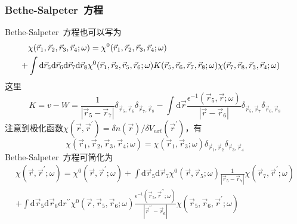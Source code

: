 \documentclass[cjk,slidestop,compress,mathserif,blue]{beamer}
\begin{document}
\frame
{
	\frametitle{\textrm{Bethe-Salpeter~}方程}
\textrm{Bethe-Salpeter~}方程也可以写为
\begin{displaymath}
	\hspace*{-10pt}
	\begin{aligned}
		&\chi(\vec r_1,\vec r_2,\vec r_3,\vec r_4;\omega)=\chi^0(\vec r_1,\vec r_2,\vec r_3,\vec r_4;\omega)\\
		+&\int\mathrm{d}\vec r_5\mathrm{d}\vec r_6\mathrm{d}\vec r_7\mathrm{d}\vec r_8\chi^0(\vec r_1,\vec r_2,\vec r_5,\vec r_6;\omega)K(\vec r_5,\vec r_6,\vec r_7,\vec r_8;\omega)\chi(\vec r_7,\vec r_8,\vec r_3,\vec r_4;\omega)
	\end{aligned}
\end{displaymath}
这里
\begin{displaymath}
	K=v-W=\frac1{|\vec r_5-\vec r_7|}\delta_{\vec r_5,\vec r_6}\delta_{\vec r_7,\vec r_8}-\int\mathrm{d}\vec r\frac{\epsilon^{-1}(\vec r_5,\vec r;\omega)}{|\vec r-\vec r_6|}\delta_{\vec r_5,\vec r_7}\delta_{\vec r_6,\vec r_8}
\end{displaymath}
注意到极化函数$\chi(\vec r,\vec r^{\prime})=\delta n(\vec r)/\delta V_{ext}(\vec r^{\prime})$，有
\begin{displaymath}
	\chi(\vec r_1,\vec r_2,\vec r_3,\vec r_4;\omega)=\chi(\vec r_1,\vec r_3;\omega)\delta_{\vec r_1,\vec r_2}\delta_{\vec r_3,\vec r_4}
\end{displaymath}
\textrm{Bethe-Salpeter~}方程可简化为
\begin{displaymath}
	\begin{aligned}
		\chi(\vec r,\vec r^{\prime};\omega)=\chi^0(\vec r,\vec r^{\prime};\omega)+\int\mathrm{d}\vec r_5\mathrm{d}\vec r_7\chi^0(\vec r,\vec r_5;\omega)\frac1{|\vec r_5-\vec r_7|}\chi(\vec r_7,\vec r^{\prime};\omega)\\
		+\int\mathrm{d}\vec r_5\mathrm{d}\vec r_6\mathrm{d}r^{\prime\prime}\chi^0(\vec r,\vec r_5,\vec r_6;\omega)\frac{\epsilon^{-1}(\vec r_5,\vec r^{\prime\prime};\omega)}{|\vec r^{\prime\prime}-\vec r_6|}\chi(\vec r_5,\vec r_6,\vec r^{\prime};\omega)
	\end{aligned}
\end{displaymath}
}
\end{document}
